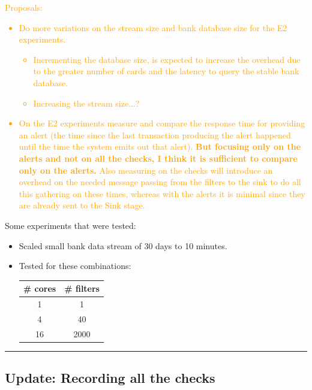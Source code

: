 \documentclass[12pt,a4paper]{article}
\begin{document}
\textcolor{orange}{
Proposals:
\begin{itemize}
    \item Do more variations on the stream size and bank database size for the E2 experiments.
    \begin{itemize}
        \item Incrementing the database size, is expected to increase the overhead due to the greater number of cards and the latency to query the stable bank database.
        \item Increasing the stream size...?
    \end{itemize}
    \item On the E2 experiments measure and compare the response time for providing an alert (the time since the last transaction producing the alert happened until the time the system emits out that alert). \textbf{But focusing only on the alerts and not on all the checks, I think it is sufficient to compare only on the alerts.} Also measuring on the checks will introduce an overhead on the needed message passing from the filters to the sink to do all this gathering on these times, whereas with the alerts it is minimal since they are already sent to the Sink stage.
\end{itemize}
}

Some experiments that were tested:

\begin{itemize}
    \item Scaled small bank data stream of 30 days to 10 minutes.
    \item Tested for these combinations:
    \begin{table}[H]
      \renewcommand{\arraystretch}{1.5} %
      \centering
      \begin{tabular}{|c|c|}
      \hline
      \# cores & \# filters \\ \hline
      1        & 1  \\ \hline
      4        & 40  \\ \hline
      16       & 2000  \\ \hline
      \end{tabular}
    \end{table}
\end{itemize}

\rule{\textwidth}{0.4pt} 

\subsection{Update: Recording all the checks}
\end{document}
